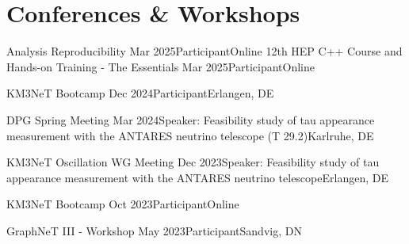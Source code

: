 \documentclass[letterpaper,11pt]{article}
\begin{document}
      
      



\section{Conferences \& Workshops}
\resumeSubHeadingListStart
      \resumeSubheading
      {Analysis Reproducibility}
      {Mar 2025}{Participant}{Online}
      \resumeSubheading
      {12th HEP C++ Course and Hands-on Training - The Essentials}
      {Mar 2025}{Participant}{Online}
      
      \resumeSubheading
      {KM3NeT Bootcamp}
      {Dec 2024}{Participant}{Erlangen, DE}
      
      \resumeSubheading
      {DPG Spring Meeting}
      {Mar 2024}{Speaker: Feasibility study of tau appearance measurement with the ANTARES neutrino telescope (T 29.2)}{Karlruhe, DE}

      \resumeSubheading
      {KM3NeT Oscillation WG Meeting}
      {Dec 2023}{Speaker: Feasibility study of tau appearance measurement with the ANTARES neutrino telescope}{Erlangen, DE}

      \resumeSubheading
      {KM3NeT Bootcamp}
      {Oct 2023}{Participant}{Online}
      
      \resumeSubheading
      {GraphNeT III - Workshop}
      {May 2023}{Participant}{Sandvig, DN}
\resumeSubHeadingListEnd
\end{document}

